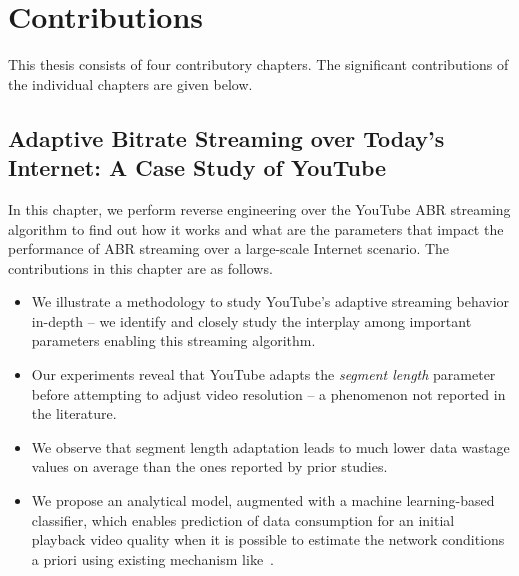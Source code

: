 \section{Contributions}
This thesis consists of four contributory chapters. The significant contributions of the individual chapters are given below. 

\subsection{Adaptive Bitrate Streaming over Today's Internet: A Case Study of YouTube}
In this chapter, we perform reverse engineering over the YouTube \ac{ABR} streaming algorithm to find out how it works and what are the parameters that impact the performance of \ac{ABR} streaming over a large-scale Internet scenario. The contributions in this chapter are as follows. 
\begin{itemize}
	\item We illustrate a methodology to study YouTube's adaptive streaming behavior in-depth -- we identify and closely study the interplay among important parameters enabling this streaming algorithm.
	\item Our experiments reveal that YouTube adapts the {\it segment length} parameter before attempting to adjust video resolution -- a phenomenon not reported in the literature.
	\item We observe that segment length adaptation leads to much lower data wastage values on average than the ones reported by prior studies.
	\item We propose an analytical model, augmented with a machine learning-based classifier, which enables prediction of data consumption for an initial playback video quality when it is possible to estimate the network conditions a priori using existing mechanism like~\cite{Zou2015}.
\end{itemize}

